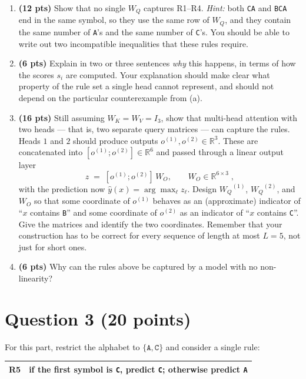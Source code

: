 \documentclass[11pt]{article}
\newcommand{\wrd}[1]{\texttt{#1}}
\newcommand{\Wq}{\ensuremath{W_Q}}
\newcommand{\Wk}{\ensuremath{W_K}}
\newcommand{\Wv}{\ensuremath{W_V}}
\newcommand{\pred}{\ensuremath{\hat{y}}}
\begin{document}
\begin{enumerate}[label=(\alph*)]

  \item \textbf{(12 pts)} Show that no single $\Wq$ captures R1--R4. \emph{Hint:} both \wrd{CA} and \wrd{BCA}
  end in the same symbol, so they use the same row of $\Wq$, and they contain the same number of \wrd{A}'s and
  the same number of \wrd{C}'s. You should be able to write out two incompatible inequalities that these rules require. 


  \item \textbf{(6 pts)} Explain in two or three sentences \emph{why} this happens, in terms of how the scores
  $s_i$ are computed. Your explanation should make clear what property of the rule set a single head cannot
  represent, and should not depend on the particular counterexample from (a).

  \item \textbf{(16 pts)} Still assuming $\Wk = \Wv = I_3$, show that multi-head attention with two heads ---
  that is, two separate query matrices --- can capture the rules. Heads $1$ and $2$ should produce outputs $o^{(1)}, o^{(2)} \in
  \mathbb{R}^3$. These are concatenated into $[o^{(1)}; o^{(2)}] \in \mathbb{R}^6$ and passed through a linear output layer
  \[
  z \;=\; [o^{(1)}; o^{(2)}]\, W_O, \qquad W_O \in \mathbb{R}^{6\times 3}\;,
  \]
  with the prediction now $\pred(x) = \arg\max_\ell z_\ell$. Design $\Wq^{(1)}$, $\Wq^{(2)}$, and $W_O$ so that some
  coordinate of $o^{(1)}$ behaves as an (approximate) indicator of ``$x$ contains \wrd{B}'' and some coordinate
  of $o^{(2)}$ as an indicator of ``$x$ contains \wrd{C}''. Give the matrices and identify the two coordinates.
  Remember that your construction has to be correct for every sequence of length at most $L = 5$, not just for
  short ones.

  \item \textbf{(6 pts)} Why can the rules above be captured by a model with no non-linearity? 
  

\end{enumerate}

\section{Question 3 (20 points)}

For this part, restrict the alphabet to $\{\wrd{A}, \wrd{C}\}$ and consider a single rule:
\begin{center}
\begin{tabular}{ll}
\toprule
R5 & if the first symbol is \wrd{C}, predict \wrd{C}; otherwise predict \wrd{A}\\
\bottomrule
\end{tabular}
\end{center}
\end{document}

